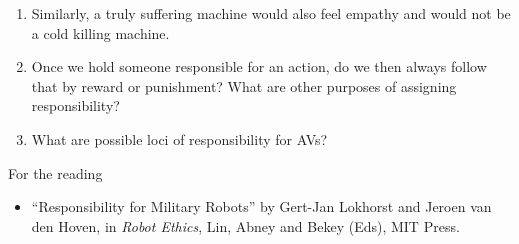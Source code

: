 \documentclass[letta4 paper]{article}
\numberwithin{equation}{section}
\newcommand{\0}{\mathbf{0}}
\begin{document}
\begin{enumerate}
		\item Similarly, a truly suffering machine would also feel empathy and would not be a cold killing machine.
		
		\item Once we hold someone responsible for an action, do we then always follow that by reward or punishment? What are other purposes of assigning responsibility?
		
		\item What are possible loci of responsibility for AVs?
	\end{enumerate}
	
	For the reading
	\begin{itemize}
		\item ``Responsibility for Military Robots'' by Gert-Jan Lokhorst and Jeroen van den Hoven, in \textit{Robot Ethics}, Lin, Abney and Bekey (Eds), MIT Press.
	\end{itemize}
	
\end{document}
